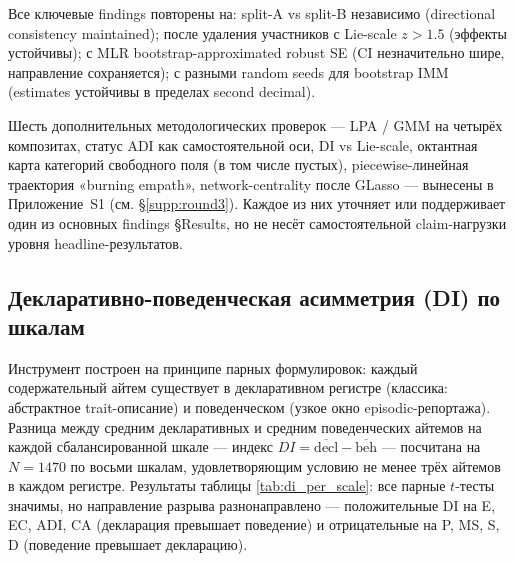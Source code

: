 Все ключевые findings повторены на: split-A vs split-B независимо (directional consistency maintained); после удаления участников с Lie-scale $z > 1.5$ (эффекты устойчивы); с MLR bootstrap-approximated robust SE (CI незначительно шире, направление сохраняется); с разными random seeds для bootstrap IMM (estimates устойчивы в пределах second decimal).

Шесть дополнительных методологических проверок --- LPA / GMM на четырёх композитах, статус ADI как самостоятельной оси, DI vs Lie-scale, октантная карта категорий свободного поля (в том числе пустых), piecewise-линейная траектория «burning empath», network-centrality после GLasso --- вынесены в Приложение~S1 (см. §\ref{supp:round3}). Каждое из них уточняет или поддерживает один из основных findings §Results, но не несёт самостоятельной claim-нагрузки уровня headline-результатов.

\subsection{Декларативно-поведенческая асимметрия (DI) по шкалам}
\label{subsec:di_results}

Инструмент построен на принципе парных формулировок: каждый содержательный айтем существует в декларативном регистре (классика: абстрактное trait-описание) и поведенческом (узкое окно episodic-репортажа). Разница между средним декларативных и средним поведенческих айтемов на каждой сбалансированной шкале --- индекс $DI = \overline{\text{decl}} - \overline{\text{beh}}$ --- посчитана на $N{=}1470$ по восьми шкалам, удовлетворяющим условию не менее трёх айтемов в каждом регистре. Результаты таблицы \ref{tab:di_per_scale}: все парные $t$-тесты значимы, но направление разрыва разнонаправлено --- положительные DI на E, EC, ADI, CA (декларация превышает поведение) и отрицательные на P, MS, S, D (поведение превышает декларацию).

